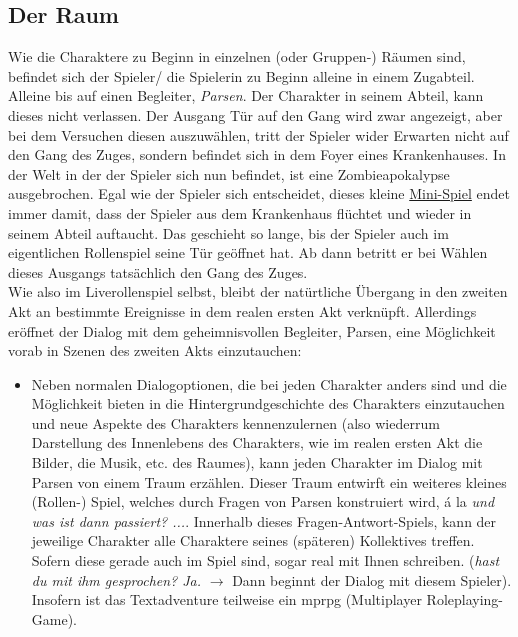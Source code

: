 \documentclass[a4paper, 12pt]{scrartcl}
\begin{document}
    \subsection{Der Raum}
    Wie die Charaktere zu Beginn in einzelnen (oder Gruppen-) Räumen sind, befindet sich der Spieler/ die Spielerin zu Beginn alleine in einem Zugabteil. 
    Alleine bis auf einen Begleiter, \textit{Parsen}.
    Der Charakter in seinem Abteil, kann dieses nicht verlassen. 
    Der Ausgang \glqq Tür auf den Gang\grqq{} wird zwar angezeigt, aber bei dem Versuchen diesen auszuwählen, tritt der Spieler wider Erwarten nicht auf den Gang des Zuges, sondern befindet sich in dem Foyer eines Krankenhauses. 
    In der Welt in der der Spieler sich nun befindet, ist eine Zombieapokalypse ausgebrochen. 
    Egal wie der Spieler sich entscheidet, dieses kleine \hyperref[zombieapokalypse]{Mini-Spiel} endet immer damit, dass der Spieler aus dem Krankenhaus flüchtet und wieder in seinem Abteil auftaucht.
    Das geschieht so lange, bis der Spieler auch im eigentlichen Rollenspiel seine Tür geöffnet hat.
    Ab dann betritt er bei Wählen dieses Ausgangs tatsächlich den Gang des Zuges.\\
    Wie also im Liverollenspiel selbst, bleibt der \glqq natürtliche\grqq{} Übergang in den zweiten Akt an bestimmte Ereignisse in dem \glqq realen\grqq{} ersten Akt verknüpft. 
    Allerdings eröffnet der Dialog mit dem geheimnisvollen Begleiter, Parsen, eine Möglichkeit vorab in Szenen des zweiten Akts einzutauchen: 
    \begin{itemize}
    \item[] Neben normalen Dialogoptionen, die bei jeden Charakter anders sind und die Möglichkeit bieten in die Hintergrundgeschichte des Charakters einzutauchen und neue Aspekte des Charakters kennenzulernen (also wiederrum Darstellung des Innenlebens des Charakters, wie im realen ersten Akt die Bilder, die Musik, etc. des Raumes), kann jeden Charakter im Dialog mit Parsen von einem Traum erzählen. 
    Dieser Traum entwirft ein weiteres kleines (Rollen-) Spiel, welches durch Fragen von Parsen konstruiert wird, á la \textit{und was ist dann passiert? ...}. 
    Innerhalb dieses Fragen-Antwort-Spiels, kann der jeweilige Charakter alle Charaktere seines (späteren) Kollektives treffen.
    Sofern diese gerade auch im Spiel sind, sogar real mit Ihnen schreiben. (\textit{\frqq hast du mit ihm gesprochen?\flqq{} \frqq Ja\flqq.} $\rightarrow$ Dann beginnt der Dialog mit diesem Spieler).
    Insofern ist das Textadventure teilweise ein mprpg (Multiplayer Roleplaying-Game).
    \end{itemize}
\end{document}
